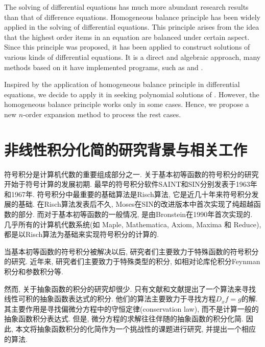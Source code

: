 The solving of differential equations has much more abundant research results than that of difference equations. Homogeneous balance principle has been widely applied in the solving of differential equations. This principle arises from the idea that the highest order items in an equation are balanced under certain aspect. Since this principle was proposed\citep{wang1995solitary,wang1996application}, it has been applied to construct solutions of various kinds of differential equations\citep{hbAppl2006,hbAppl2009a,hbAppl2009b,hbAppl2010}. It is a direct and algebraic approach, many methods based on it have implemented programs, such as \cite{li2002rath} and \cite{li2004raeem}.

Inspired by the application of homogeneous balance principle in differential equations, we decide to apply it in seeking polynomial solutions of . However, the homogeneous balance principle works only in some cases. Hence, we propose a new $n$-order expansion method to process the rest cases.

\section{非线性积分化简的研究背景与相关工作}
符号积分是计算机代数的重要组成部分之一. 关于基本初等函数的符号积分的研究开始于符号计算的发展初期. 最早的符号积分软件SAINT和SIN分别发表于1963年\citep{slagle1963}和1967年\citep{moses1967}. 符号积分中最重要的基础算法是Risch算法\citep{risch1969,risch1970}, 它是近几十年来符号积分发展的基础. 在Risch算法发表后不久, Moses在SIN的改进版本中首次实现了纯超越函数的部分\citep{moses1971}. 而对于基本初等函数的一般情况, 是由Bronstein在1990年首次实现的\citep{bronstein1990}. 几乎所有的计算机代数系统(如 Maple, Mathematica, Axiom, Maxima 和 Reduce), 都是以Risch算法为基础来实现符号积分的计算的. 

当基本初等函数的符号积分被解决以后, 研究者们主要致力于特殊函数的符号积分的研究\citep{cherry1985,cherry1986,bertrand1994,jeffrey1997}. 近年来, 研究者们主要致力于特殊类型的积分, 如相对论库伦积分\citep{paule2012,paule2013}\zdh Feynman积分\citep{blumlein2012,smirnov2015}和参数积分\citep{raab2016}等.

然而, 关于抽象函数的积分的研究却很少. 只有文献\cite{deconinck2009}和文献\cite{poole2010}提出了一个算法来寻找线性可积的抽象函数表达式的积分. 他们的算法主要致力于寻找方程$D_x f=g$的解. 其主要作用是寻找偏微分方程中的守恒定律(conservation law)\citep{poole2011}, 而不是计算一般的抽象函数积分表达式. 但是, 微分方程的求解往往伴随的抽象函数的积分化简. 因此, 本文将抽象函数积分的化简作为一个挑战性的课题进行研究, 并提出一个相应的算法.


